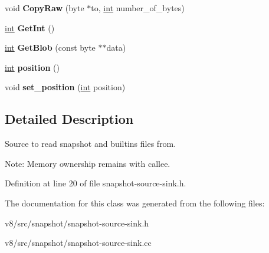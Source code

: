\begin{DoxyCompactItemize}
void {\bfseries Copy\+Raw} (byte $\ast$to, \mbox{\hyperlink{classint}{int}} number\+\_\+of\+\_\+bytes)
\item 
\mbox{\label{classv8_1_1internal_1_1SnapshotByteSource_ad5cb3ae81d5d7b7472275810f00b5909}} 
\mbox{\hyperlink{classint}{int}} {\bfseries Get\+Int} ()
\item 
\mbox{\label{classv8_1_1internal_1_1SnapshotByteSource_a0d703872a07e2b59582be56138c35728}} 
\mbox{\hyperlink{classint}{int}} {\bfseries Get\+Blob} (const byte $\ast$$\ast$data)
\item 
\mbox{\label{classv8_1_1internal_1_1SnapshotByteSource_a6f196210f0bf57cae0c66ca659e7a130}} 
\mbox{\hyperlink{classint}{int}} {\bfseries position} ()
\item 
\mbox{\label{classv8_1_1internal_1_1SnapshotByteSource_afab8fb9010737708c59913c697bb324d}} 
void {\bfseries set\+\_\+position} (\mbox{\hyperlink{classint}{int}} position)
\end{DoxyCompactItemize}


\subsection{Detailed Description}
Source to read snapshot and builtins files from.

Note\+: Memory ownership remains with callee. 

Definition at line 20 of file snapshot-\/source-\/sink.\+h.



The documentation for this class was generated from the following files\+:\begin{DoxyCompactItemize}
\item 
v8/src/snapshot/snapshot-\/source-\/sink.\+h\item 
v8/src/snapshot/snapshot-\/source-\/sink.\+cc\end{DoxyCompactItemize}
